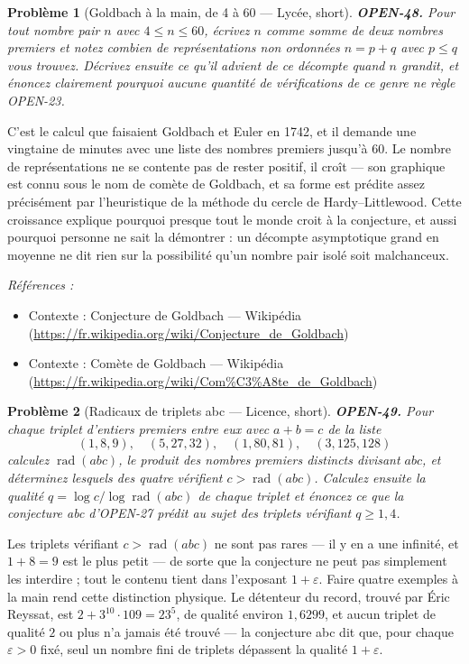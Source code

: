 \documentclass[11pt]{article}
\newtheorem{problem}{Problème}
\newenvironment{refs}{\par\small\noindent\emph{Références :}\begin{itemize}\setlength\itemsep{0pt}}{\end{itemize}\normalsize}
\begin{document}
\bigskip

\begin{problem}[{Goldbach à la main, de 4 à 60 --- Lycée, short}]
\textbf{OPEN-48.} Pour tout nombre pair $ n $ avec
$ 4 \leq n \leq 60 $, écrivez $ n $ comme somme de deux nombres premiers et notez
combien de représentations non ordonnées $ n = p + q $ avec $ p \leq q $ vous trouvez.
Décrivez ensuite ce qu'il advient de ce décompte quand $ n $ grandit, et énoncez
clairement pourquoi aucune quantité de vérifications de ce genre ne règle OPEN-23.
\end{problem}

\noindent C'est le calcul que faisaient Goldbach et Euler en 1742, et il demande
une vingtaine de minutes avec une liste des nombres premiers jusqu'à $ 60 $. Le nombre
de représentations ne se contente pas de rester positif, il croît --- son graphique est
connu sous le nom de comète de Goldbach, et sa forme est prédite assez précisément par
l'heuristique de la méthode du cercle de Hardy--Littlewood. Cette croissance explique
pourquoi presque tout le monde croit à la conjecture, et aussi pourquoi personne ne sait
la démontrer : un décompte asymptotique grand en moyenne ne dit rien sur la possibilité
qu'un nombre pair isolé soit malchanceux.

\begin{refs}
\item Contexte : Conjecture de Goldbach --- Wikipédia (\url{https://fr.wikipedia.org/wiki/Conjecture_de_Goldbach})
\item Contexte : Comète de Goldbach --- Wikipédia (\url{https://fr.wikipedia.org/wiki/Com%C3%A8te_de_Goldbach})
\end{refs}

\bigskip

\begin{problem}[{Radicaux de triplets abc --- Licence, short}]
\textbf{OPEN-49.} Pour chaque triplet d'entiers premiers entre eux
avec $ a + b = c $ de la liste
\[ (1,8,9), \quad (5,27,32), \quad (1,80,81), \quad (3,125,128) \]
calculez $ \operatorname{rad}(abc) $, le produit des nombres premiers distincts divisant
$ abc $, et déterminez lesquels des quatre vérifient
$ c > \operatorname{rad}(abc) $. Calculez ensuite la \textit{qualité}
$ q = \log c / \log \operatorname{rad}(abc) $ de chaque triplet et énoncez ce que la
conjecture abc d'OPEN-27 prédit au sujet des triplets vérifiant $ q \geq 1{,}4 $.
\end{problem}

\noindent Les triplets vérifiant $ c > \operatorname{rad}(abc) $ ne sont pas
rares --- il y en a une infinité, et $ 1 + 8 = 9 $ est le plus petit --- de sorte que la
conjecture ne peut pas simplement les interdire ; tout le contenu tient dans l'exposant
$ 1 + \varepsilon $. Faire quatre exemples à la main rend cette distinction physique. Le
détenteur du record, trouvé par Éric Reyssat, est $ 2 + 3^{10} \cdot 109 = 23^{5} $, de
qualité environ $ 1{,}6299 $, et aucun triplet de qualité $ 2 $ ou plus n'a jamais été
trouvé --- la conjecture abc dit que, pour chaque $ \varepsilon > 0 $ fixé, seul un nombre
fini de triplets dépassent la qualité $ 1 + \varepsilon $.
\end{document}
